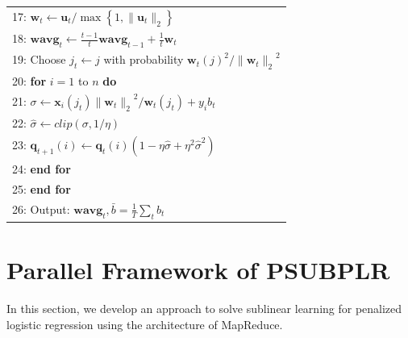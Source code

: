 \documentclass{llncs}
\newcommand{\bw}{\mathbf{w}}
\newcommand{\bwavg}{\mathbf{wavg}}
\newcommand{\bu}{\mathbf{u}}
\newcommand{\bq}{\mathbf{q}}
\newcommand{\lc}{\left(}
\newcommand{\rc}{\right)}
\newcommand{\li}{\lc i\rc}
\newcommand{\lj}{\lc j\rc}
\newcommand{\tspace}{\hspace*{2em}}
\newcommand{\tspaces}{\hspace*{1.5em}}
\begin{document}
\begin{table}[ht]
\begin{tabular}{l}
		17:   \tspaces ${\bw}_{t}\leftarrow {\bu}_{t}/\max \left\{1,\|{\bu}_{t}\|_2 \right\}$ \\
		18:   \tspaces ${\bwavg}_{t}\leftarrow \frac{t-1}{t}{\bwavg}_{t-1}+\frac{1}{t}\bw_t$ \\
		19:   \tspaces Choose ${j}_{t}\leftarrow j$ with probability ${{\bw}_{t}\lj}^{2}/{\|{\bw}_{t}\|_2}^{2} $ \\
		20:   \tspaces \textbf{for} $i=1$ to $n$ \textbf{do} \\
		21:   \tspaces\tspace $\sigma \leftarrow \mathbf{x}_{i} \lc {j}_{t}\rc{\|{\bw}_{t}\|_2}^{2}/{\bw}_{t}\lc {j}_{t} \rc+{y}_{i}{b}_{t}$ \\
		22:   \tspaces\tspace $\hat{\sigma} \leftarrow clip\lc \sigma,1/\eta \rc$ \\
		23:   \tspaces\tspace ${\bq}_{t+1}\li \leftarrow {\bq}_{t}\li\lc 1-\eta\hat{\sigma} + {\eta}^{2}{\hat{\sigma}}^{2} \rc$ \\
		24:   \tspaces \textbf{end for} \\
		25:   \textbf{end for} \\
		26:   Output: $\bwavg_t,\bar{b}=\frac{1}{T}\sum_{t}{b}_{t}$ \\
	\hline
	\end{tabular}
	\end{table}

\section{Parallel Framework of PSUBPLR} \label{sec:framework}
	
In this section, we develop an approach to solve sublinear learning for penalized logistic regression using the architecture of MapReduce.
\end{document}
